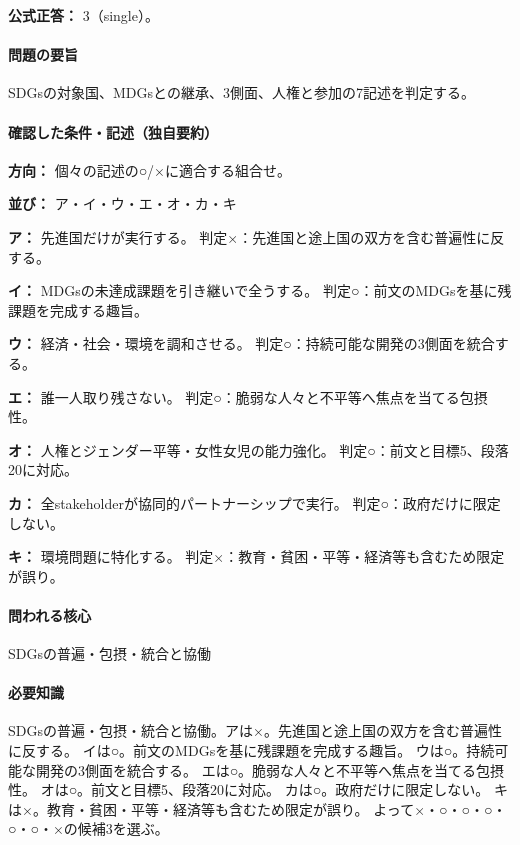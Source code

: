 \textbf{公式正答：} 3（single）。

\paragraph{問題の要旨} SDGsの対象国、MDGsとの継承、3側面、人権と参加の7記述を判定する。

\paragraph{確認した条件・記述（独自要約）}\mbox{}\par

\noindent\textbf{方向：} 個々の記述の○/×に適合する組合せ。\par

\noindent\textbf{並び：} ア・イ・ウ・エ・オ・カ・キ\par

\noindent\textbf{ア：} 先進国だけが実行する。 判定×：先進国と途上国の双方を含む普遍性に反する。\par

\noindent\textbf{イ：} MDGsの未達成課題を引き継いで全うする。 判定○：前文のMDGsを基に残課題を完成する趣旨。\par

\noindent\textbf{ウ：} 経済・社会・環境を調和させる。 判定○：持続可能な開発の3側面を統合する。\par

\noindent\textbf{エ：} 誰一人取り残さない。 判定○：脆弱な人々と不平等へ焦点を当てる包摂性。\par

\noindent\textbf{オ：} 人権とジェンダー平等・女性女児の能力強化。 判定○：前文と目標5、段落20に対応。\par

\noindent\textbf{カ：} 全stakeholderが協同的パートナーシップで実行。 判定○：政府だけに限定しない。\par

\noindent\textbf{キ：} 環境問題に特化する。 判定×：教育・貧困・平等・経済等も含むため限定が誤り。\par

\paragraph{問われる核心} SDGsの普遍・包摂・統合と協働

\paragraph{必要知識} SDGsの普遍・包摂・統合と協働。アは×。先進国と途上国の双方を含む普遍性に反する。 イは○。前文のMDGsを基に残課題を完成する趣旨。 ウは○。持続可能な開発の3側面を統合する。 エは○。脆弱な人々と不平等へ焦点を当てる包摂性。 オは○。前文と目標5、段落20に対応。 カは○。政府だけに限定しない。 キは×。教育・貧困・平等・経済等も含むため限定が誤り。 よって×・○・○・○・○・○・×の候補3を選ぶ。

